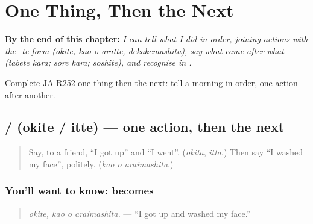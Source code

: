 
\chapter{One Thing, Then the Next}
\label{ch:ja-one-thing-then-the-next}

\begin{chapteropening}
\textbf{By the end of this chapter:} \emph{I can tell what I did in order, joining actions with the -te form (okite, kao o aratte, dekakemashita), say what came after what (tabete kara; sore kara; soshite), and recognise  in .}

Complete JA-R252-one-thing-then-the-next: tell a morning in order, one action after another.
\end{chapteropening}

\section[\texorpdfstring{\ja{おきて} / \ja{いって} (okite / itte)}{おきて / いって (okite / itte)}]{ /  (okite / itte) — one action, then the next}

\label{lesson:JA-C252-okite}



\begin{quote}
Say, to a friend, \textquotedblleft{}I got up\textquotedblright{} and \textquotedblleft{}I went\textquotedblright{}. (\emph{okita}, \emph{itta}.) Then say \textquotedblleft{}I washed my face\textquotedblright{}, politely. (\emph{kao o araimashita}.)
\end{quote}

\subsection*{You'll want to know:  becomes }
\begin{quote}
\textbf{ }
\end{quote}

\begin{quote}
\emph{okite, kao o araimashita.} — \textquotedblleft{}I got up and washed my face.\textquotedblright{}
\end{quote}

